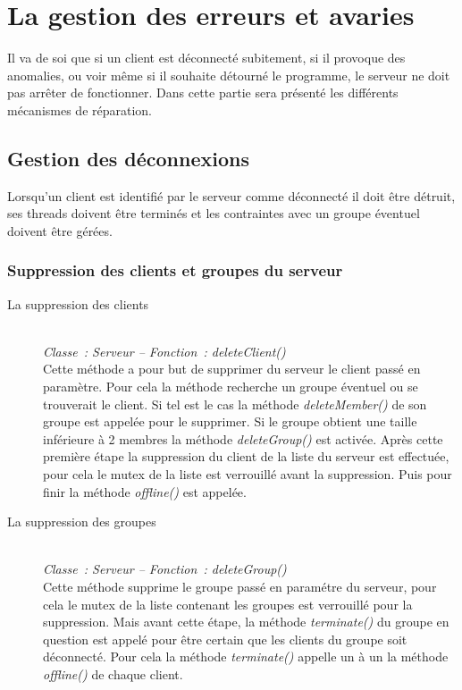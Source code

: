 \documentclass[a4paper, titlepage]{livret}
\begin{document}
\section{La gestion des erreurs et avaries}
  Il va de soi que si un client est déconnecté subitement, si il provoque des anomalies, ou voir même si il souhaite détourné le programme, le serveur ne doit pas arrêter de fonctionner. Dans cette partie sera présenté les différents mécanismes de réparation.

\subsection{Gestion des déconnexions}
  Lorsqu’un client est identifié par le serveur comme déconnecté il doit être détruit, ses threads doivent être terminés et les contraintes avec un groupe éventuel doivent être gérées.

\subsubsection{Suppression des clients et groupes du serveur}

\begin{description}
  \item[La suppression des clients]
  \textit{\\Classe : Serveur – Fonction : deleteClient()\\}
    Cette méthode a pour but de supprimer du serveur le client passé en paramètre. Pour cela la méthode recherche un groupe éventuel ou se trouverait le client. Si tel est le cas la méthode \textit{deleteMember()} de son groupe est appelée pour le supprimer. Si le groupe obtient une taille inférieure à 2 membres la méthode  \textit{deleteGroup()} est activée.
Après cette première étape la suppression du client de la liste du serveur est effectuée, pour cela le mutex de la liste est verrouillé avant la suppression. Puis pour finir la méthode \textit{offline()} est appelée.
   
   \item[La suppression des groupes]
   \textit{\\Classe : Serveur – Fonction : deleteGroup()\\}
   Cette méthode supprime le groupe passé en paramétre du serveur, pour cela le mutex de la liste contenant les groupes est verrouillé pour la suppression. Mais avant cette étape, la méthode \textit{terminate()} du groupe en question est appelé pour être certain que les clients du groupe soit déconnecté. Pour cela la méthode \textit{terminate()} appelle un à un la méthode \textit{offline()} de chaque client.
\end{description}
\end{document}
